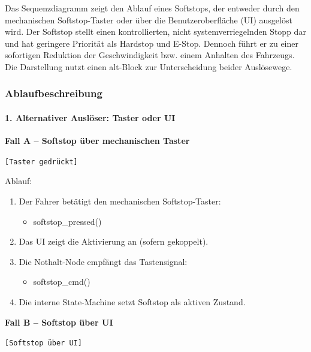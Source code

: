 \quad Das Sequenzdiagramm zeigt den Ablauf eines \ac{Softstop}s, der entweder durch den mechanischen \ac{Softstop}-Taster oder über die Benutzeroberfläche (UI) ausgelöst wird.  
Der \ac{Softstop} stellt einen kontrollierten, nicht systemverriegelnden Stopp dar und hat geringere 
Priorität als \ac{Hardstop} und \ac{E-Stop}. Dennoch führt er zu einer sofortigen Reduktion der Geschwindigkeit bzw. einem Anhalten des Fahrzeugs.
Die Darstellung nutzt einen alt-Block zur Unterscheidung beider Auslösewege.

\subsubsection*{Ablaufbeschreibung}

\paragraph{1. Alternativer Auslöser: Taster oder UI}

\textbf{Fall A – Softstop über mechanischen Taster}

\begin{description}
    \item[\texttt{[Taster gedrückt]}]
\end{description}

Ablauf:
\begin{enumerate}
    \item Der Fahrer betätigt den mechanischen Softstop-Taster:
    \begin{itemize}
        \item softstop\_pressed()
    \end{itemize}
    \item Das UI zeigt die Aktivierung an (sofern gekoppelt).
    \item Die Nothalt-Node empfängt das Tastensignal:
    \begin{itemize}
        \item softstop\_cmd()
    \end{itemize}
    \item Die interne State-Machine setzt Softstop als aktiven Zustand.
\end{enumerate}

\textbf{Fall B – Softstop über UI}

\begin{description}
    \item[\texttt{[Softstop über UI]}]
\end{description}

